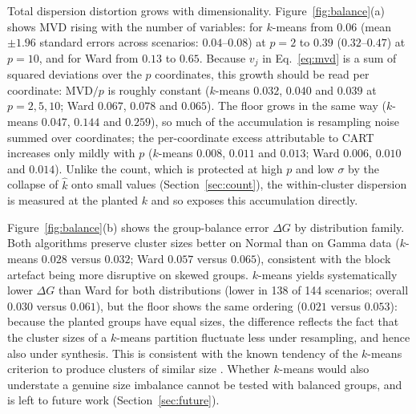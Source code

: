\documentclass[pdflatex,referee]{sn-jnl}
\begin{document}
\begin{table}[t]
\centering
\caption{Geometric fidelity after CART synthesis (observed), under bootstrap
         resampling of the original data (floor, $B = 30$) and their
         difference (excess), averaged over the 144 scenario means, at the
         planted $k$. MCD, MVD and $\Delta G$ are in the units of the scaler
         fit on the original data; $\mathrm{MCD}_{\mathrm{sd}}$ is in
         within-component standard deviations and RVD is a relative error.
         Last column: Wilcoxon $p$ for the excess of $k$-means against the
         excess of Ward across the 144 scenarios. Values by separation,
         distribution family and dimensionality are in Supplementary
         Section~S5.}
\label{tab:floor}
\small

\end{table}

Total dispersion distortion grows with dimensionality.
Figure~\ref{fig:balance}(a) shows MVD rising with the number of variables: for
$k$-means from $0.06$ (mean $\pm 1.96$ standard errors across scenarios:
$0.04$--$0.08$) at $p = 2$ to $0.39$
($0.32$--$0.47$) at $p = 10$, and for Ward from $0.13$ to $0.65$. Because $v_j$
in Eq.~\eqref{eq:mvd} is a sum of squared deviations over the $p$ coordinates,
this growth should be read per coordinate: $\mathrm{MVD}/p$ is roughly constant
($k$-means $0.032$, $0.040$ and $0.039$ at $p = 2, 5, 10$; Ward $0.067$,
$0.078$ and $0.065$). The floor grows in the same way ($k$-means $0.047$,
$0.144$ and $0.259$), so much of the accumulation is resampling noise summed
over coordinates; the per-coordinate excess attributable to CART increases
only mildly with $p$ ($k$-means $0.008$, $0.011$ and $0.013$; Ward $0.006$,
$0.010$ and $0.014$). Unlike the count, which is protected at high $p$ and low
$\sigma$ by the collapse of $\hat{k}$ onto small values
(Section~\ref{sec:count}), the within-cluster dispersion is measured at the
planted $k$ and so exposes this accumulation directly.

Figure~\ref{fig:balance}(b) shows the group-balance error $\Delta G$ by
distribution family. Both algorithms preserve cluster sizes better on Normal
than on Gamma data ($k$-means $0.028$ versus $0.032$; Ward $0.057$ versus
$0.065$), consistent with the block artefact being more disruptive on skewed
groups. $k$-means yields systematically lower $\Delta G$ than Ward for both
distributions (lower in 138 of 144 scenarios; overall $0.030$ versus $0.061$),
but the floor shows the same ordering ($0.021$ versus $0.053$): because the
planted groups have equal sizes, the difference reflects the fact that the
cluster sizes of a $k$-means partition fluctuate less under resampling, and
hence also under synthesis. This is consistent with the known tendency of the
$k$-means criterion to produce clusters of similar size \citep{xiong2009}.
Whether $k$-means would also understate a genuine size imbalance cannot be
tested with balanced groups, and is left to future work
(Section~\ref{sec:future}).
\end{document}
